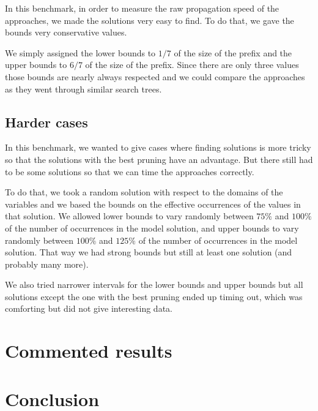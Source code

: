 \documentclass[a4paper,10pt]{article}
\begin{document}
In this benchmark, in order to measure the raw propagation speed of the approaches, we made the solutions very easy to find. To do that, we gave the bounds very conservative values.

We simply assigned the lower bounds to $1/7$ of the size of the prefix and the upper bounds to $6/7$ of the size of the prefix. Since there are only three values those bounds are nearly always respected and we could compare the approaches as they went through similar search trees.

\subsection{Harder cases}
\label{subsec:tests-hard}

In this benchmark, we wanted to give cases where finding solutions is more tricky so that the solutions with the best pruning have an advantage. But there still had to be some solutions so that we can time the approaches correctly.

To do that, we took a random solution with respect to the domains of the variables and we based the bounds on the effective occurrences of the values in that solution. We allowed lower bounds to vary randomly between $75\%$ and $100\%$ of the number of occurrences in the model solution, and upper bounds to vary randomly between $100\%$ and $125\%$ of the number of occurrences in the model solution. That way we had strong bounds but still at least one solution (and probably many more).

We also tried narrower intervals for the lower bounds and upper bounds but all solutions except the one with the best pruning ended up timing out, which was comforting but did not give interesting data.

\section{Commented results}



\section{Conclusion}
\end{document}
